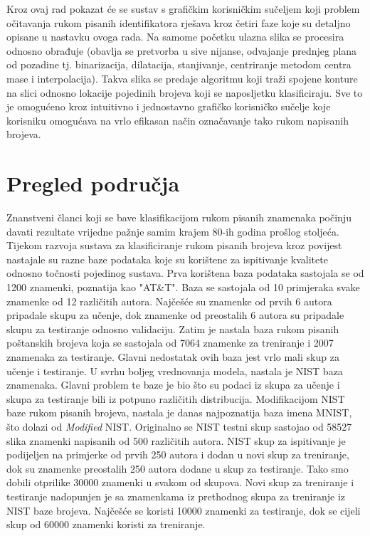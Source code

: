 \documentclass[times, utf8, diplomski]{fer}
\theoremstyle{definition}
\begin{document}
Kroz ovaj rad pokazat će se sustav s grafičkim korisničkim sučeljem  koji problem očitavanja rukom pisanih identifikatora rješava kroz četiri faze koje su detaljno opisane u nastavku ovoga rada. Na samome početku ulazna slika se procesira odnosno obrađuje (obavlja se pretvorba u sive nijanse, odvajanje prednjeg plana od pozadine tj. binarizacija, dilatacija, stanjivanje, centriranje metodom centra mase i interpolacija). Takva slika se predaje algoritmu koji traži spojene konture na slici odnosno lokacije pojedinih brojeva koji se naposljetku klasificiraju. Sve to je omogućeno kroz intuitivno i jednostavno grafičko korisničko sučelje koje korisniku omogućava na vrlo efikasan način označavanje tako rukom napisanih brojeva.
\chapter{Pregled područja}
Znanstveni članci koji se bave klasifikacijom rukom pisanih znamenaka počinju davati rezultate vrijedne pažnje samim krajem 80-ih godina prošlog stoljeća. Tijekom razvoja sustava za klasificiranje rukom pisanih brojeva kroz povijest nastajale su razne baze podataka koje su korištene za ispitivanje kvalitete odnosno točnosti pojedinog sustava. Prva korištena baza podataka sastojala se od 1200 znamenki, poznatija kao "AT\&T". Baza se sastojala od 10 primjeraka svake znamenke od 12 različitih autora. Najčešće su znamenke od prvih 6 autora pripadale skupu za učenje, dok znamenke od preostalih 6 autora su pripadale skupu za testiranje odnosno validaciju. Zatim je nastala baza rukom pisanih poštanskih brojeva koja se sastojala od 7064 znamenke za treniranje i 2007 znamenaka za testiranje. Glavni nedostatak ovih baza jest vrlo mali skup za učenje i testiranje. U svrhu boljeg vrednovanja modela, nastala je NIST baza znamenaka. Glavni problem te baze je bio što su podaci iz skupa za učenje i skupa za testiranje bili iz potpuno različitih distribucija. Modifikacijom NIST baze rukom pisanih brojeva, nastala je danas najpoznatija baza imena MNIST, što dolazi od \textit{Modified} NIST. Originalno se NIST testni skup sastojao od 58527 slika znamenki napisanih od 500 različitih autora. NIST skup za ispitivanje je podijeljen na primjerke od prvih 250 autora i dodan u novi skup za treniranje, dok su znamenke preostalih 250 autora dodane u skup za testiranje. Tako smo dobili otprilike 30000 znamenki u svakom od skupova. Novi skup za treniranje i testiranje nadopunjen je sa znamenkama iz prethodnog skupa za treniranje iz NIST baze brojeva. Najčešće se koristi 10000 znamenki za testiranje, dok se cijeli skup od 60000 znamenki koristi za treniranje.
\end{document}
